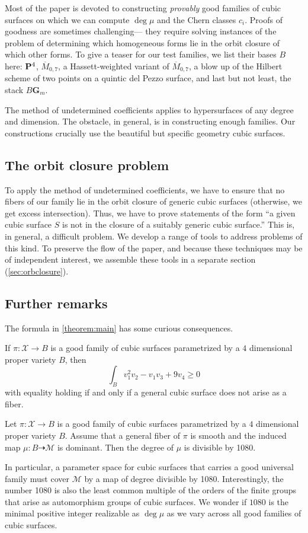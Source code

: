 \documentclass[reqno]{amsart}
\renewcommand{\to}{{\longrightarrow}}
\renewcommand {\P}{{\bf P}}
\numberwithin{equation}{section}
\newcommand{\G}{\mathbf{G}}
\newcommand{\cX}{\mathcal{X}}
\begin{document}
Most of the paper is devoted to constructing {\sl provably} good
families of cubic surfaces on which we can compute $\deg \mu$ and the
Chern classes $c_i$.  Proofs of goodness are sometimes challenging---
they require solving instances of the problem of determining which
homogeneous forms lie in the orbit closure of which other forms.
To give a teaser for our test families, we list their
bases $B$ here: $\P^4$, $\overline M_{0,7}$, a
Hassett-weighted variant of $\overline M_{0,7}$, a blow up of the
Hilbert scheme of two points on a quintic del Pezzo surface, and last
but not least, the stack $B\G_m$.

The method of undetermined coefficients applies to hypersurfaces of
any degree and dimension.  The obstacle, in general, is in
constructing enough families.  Our constructions crucially use the
beautiful but specific geometry cubic surfaces.

\subsection{The orbit closure problem}
To apply the method of undetermined coefficients, we have to ensure that no fibers of our family lie in the orbit closure of generic cubic surfaces (otherwise, we get excess intersection).
Thus, we have to prove statements of the form ``a given cubic surface $S$ is not in the closure of a suitably generic cubic surface.''
This is, in general, a difficult problem.
We develop a range of tools to address problems of this kind.
To preserve the flow of the paper, and because these techniques may be of independent interest, we assemble these tools in a separate section (\autoref{sec:orbclosure}).

\subsection{Further remarks}
The formula in \autoref{theorem:main} has some curious consequences.
\begin{corollary}
  \label{cor:ineq} If $\pi \colon \cX \to B$ is a good family of cubic
  surfaces parametrized by a $4$ dimensional proper variety $B$,
  then
  \[\int_{B} v_{1}^{2}v_{2} - v_{1}v_3 + 9v_{4} \geq 0\]
  with
  equality holding if and only if a general cubic surface does not
  arise as a fiber.
\end{corollary}

\begin{corollary}
  \label{cor:div} Let $\pi \colon \cX \to B$ is a good family of cubic
  surfaces parametrized by a $4$ dimensional proper variety $B$.
  Assume that a general fiber of $\pi$ is smooth and the induced map
  $\mu \colon B \dashrightarrow \mathcal{M}$ is dominant.
  Then the degree of $\mu$ is divisible by 1080.
\end{corollary}
In particular, a parameter space for cubic surfaces that carries a
good universal family must cover $\mathcal{M}$ by a map of degree
divisible by 1080.  Interestingly, the number 1080 is also the least
common multiple of the orders of the finite groups that arise as
automorphism groups of cubic surfaces.
We wonder if $1080$ is the minimal positive integer realizable as $\deg \mu$ as we vary
across all good families of cubic surfaces.
\end{document}
